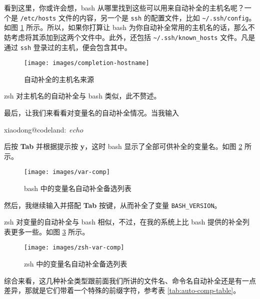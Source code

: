 \documentclass[]{ctexbook}
\newenvironment{Shaded}{\begin{snugshade}}{\end{snugshade}}
\newcommand{\ExtensionTok}[1]{#1}
\newcommand{\NormalTok}[1]{#1}
\newcommand{\VariableTok}[1]{\textcolor[rgb]{0.00,0.00,0.00}{#1}}
\begin{document}
看到这里，你或许会想，bash 从哪里找到这些可以用来自动补全的主机名呢？一个是 \texttt{/etc/hosts} 文件的内容，另一个是 \texttt{ssh} 的配置文件，比如 \texttt{\textasciitilde{}/.ssh/config}。如图 \ref{fig:completion-hostname} 所示。所以，如果你打算让 bash 为你自动补全常用的主机名的话，那么不妨考虑将其添加到这两个文件中。此外，还包括 \texttt{\textasciitilde{}/.ssh/known\_hosts} 文件。凡是通过 \texttt{ssh} 登录过的主机，便会包含其中。

\begin{figure}
\texttt{[image: images/completion-hostname]} \caption{自动补全的主机名来源}\label{fig:completion-hostname}
\end{figure}

zsh 对主机名的自动补全与 bash 类似，此不赘述。

最后，让我们来看看对变量名的自动补全情况。当我输入

\begin{Shaded}
\begin{Highlighting}[]
\ExtensionTok{xiaodong@codeland}\NormalTok{:~$ echo $}
\end{Highlighting}
\end{Shaded}

后按 \textbf{Tab} 并根据提示按 \textbf{y}，这时 bash 显示了全部可供补全的变量名。如图 \ref{fig:var-comp} 所示。

\begin{figure}
\texttt{[image: images/var-comp]} \caption{bash 中的变量名自动补全备选列表}\label{fig:var-comp}
\end{figure}

然后，我继续输入并搭配 \textbf{Tab} 按键，从而补全了变量 \texttt{BASH\_VERSION}。

\begin{Shaded}
\end{Shaded}

zsh 对变量的自动补全与 bash 相似，不过，在我的系统上比 bash 提供的补全列表更多一些。如图 \ref{fig:zsh-var-comp} 所示。

\begin{figure}
\texttt{[image: images/zsh-var-comp]} \caption{zsh 中的变量名自动补全备选列表}\label{fig:zsh-var-comp}
\end{figure}

综合来看，这几种补全类型跟前面我们所讲的文件名、命令名自动补全还是有一点差异，那就是它们带着一个特殊的前缀字符，参考表 \ref{tab:auto-comp-table}。
\end{document}

